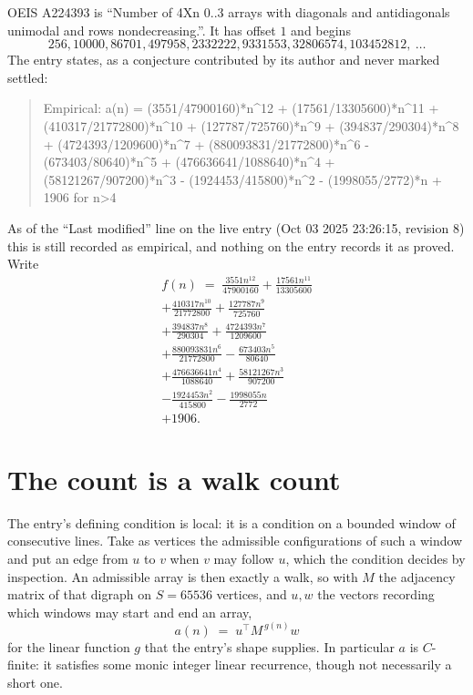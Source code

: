 \documentclass[11pt,a4paper]{article}
\theoremstyle{plain}
\theoremstyle{definition}
\begin{document}
OEIS A224393 is ``Number of 4Xn 0..3 arrays with diagonals and antidiagonals unimodal and rows nondecreasing.''. It has offset $1$ and begins
\[
256, 10000, 86701, 497958, 2332222, 9331553, 32806574, 103452812,\ \dots
\]
The entry states, as a conjecture contributed by its author and never marked settled:
\begin{quote}
Empirical: a(n) = (3551/47900160)*n\^{}12 + (17561/13305600)*n\^{}11 + (410317/21772800)*n\^{}10 + (127787/725760)*n\^{}9 + (394837/290304)*n\^{}8 + (4724393/1209600)*n\^{}7 + (880093831/21772800)*n\^{}6 - (673403/80640)*n\^{}5 + (476636641/1088640)*n\^{}4 + (58121267/907200)*n\^{}3 - (1924453/415800)*n\^{}2 - (1998055/2772)*n + 1906 for n>4
\end{quote}
As of the ``Last modified'' line on the live entry (Oct 03 2025 23:26:15, revision 8) this is still
recorded as empirical, and nothing on the entry records it as proved. Write
\begin{multline*}
f(n)\;=\;\frac{3551 n^{12}}{47900160} + \frac{17561 n^{11}}{13305600} \\
+ \frac{410317 n^{10}}{21772800} + \frac{127787 n^{9}}{725760} \\
+ \frac{394837 n^{8}}{290304} + \frac{4724393 n^{7}}{1209600} \\
+ \frac{880093831 n^{6}}{21772800} - \frac{673403 n^{5}}{80640} \\
+ \frac{476636641 n^{4}}{1088640} + \frac{58121267 n^{3}}{907200} \\
- \frac{1924453 n^{2}}{415800} - \frac{1998055 n}{2772} \\
+ 1906.
\end{multline*}

\section{The count is a walk count}

The entry's defining condition is local: it is a condition on a bounded window of consecutive lines. Take as vertices the
admissible configurations of such a window and put an edge from $u$ to $v$ when $v$ may
follow $u$, which the condition decides by inspection. An admissible array is then exactly a
walk, so with $M$ the adjacency matrix of that digraph on $S=65536$ vertices, and $u,w$ the
vectors recording which windows may start and end an array,
\[
a(n)\;=\;u^{\!\top}M^{\,g(n)}w
\]
for the linear function $g$ that the entry's shape supplies. In particular $a$ is
$C$-finite: it satisfies some monic integer linear recurrence, though not necessarily a short
one.
\end{document}
